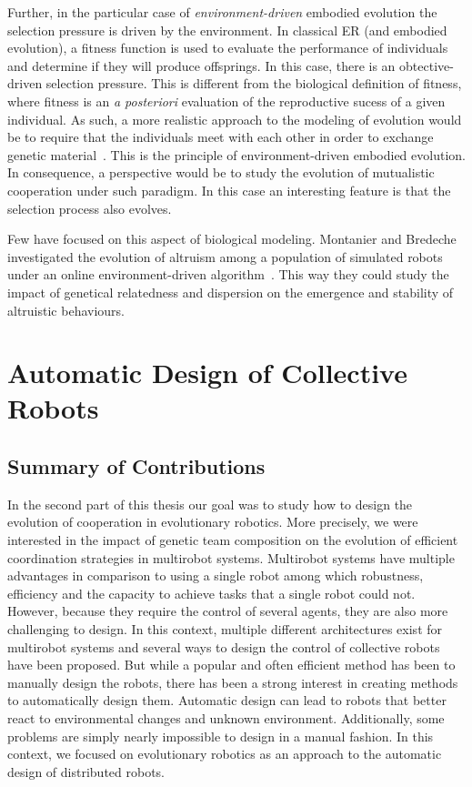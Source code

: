 			Further, in the particular case of \emph{environment-driven} embodied evolution the selection pressure is driven by the environment. In classical ER (and embodied evolution), a fitness function is used to evaluate the performance of individuals and determine if they will produce offsprings. In this case, there is an obtective-driven selection pressure. This is different from the biological definition of fitness, where fitness is an \emph{a posteriori} evaluation of the reproductive sucess of a given individual. As such, a more realistic approach to the modeling of evolution would be to require that the individuals meet with each other in order to exchange genetic material~\parencite{Bredeche2010}. This is the principle of environment-driven embodied evolution. In consequence, a perspective would be to study the evolution of mutualistic cooperation under such paradigm. In this case an interesting feature is that the selection process also evolves.

			Few have focused on this aspect of biological modeling. Montanier and Bredeche investigated the evolution of altruism among a population of simulated robots under an online environment-driven algorithm~\parencite{Montanier2011, Montanier2013}. This way they could study the impact of genetical relatedness and dispersion on the emergence and stability of altruistic behaviours.


\section{Automatic Design of Collective Robots}

	\subsection{Summary of Contributions}

		In the second part of this thesis our goal was to study how to design the evolution of cooperation in evolutionary robotics. More precisely, we were interested in the impact of genetic team composition on the evolution of efficient coordination strategies in multirobot systems. Multirobot systems have multiple advantages in comparison to using a single robot among which robustness, efficiency and the capacity to achieve tasks that a single robot could not. However, because they require the control of several agents, they are also more challenging to design. In this context, multiple different architectures exist for multirobot systems and several ways to design the control of collective robots have been proposed. But while a popular and often efficient method has been to manually design the robots, there has been a strong interest in creating methods to automatically design them. Automatic design can lead to robots that better react to environmental changes and unknown environment. Additionally, some problems are simply nearly impossible to design in a manual fashion. In this context, we focused on evolutionary robotics as an approach to the automatic design of distributed robots.

